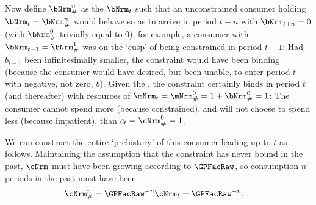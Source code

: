 \documentclass[\econtexRoot/BufferStockTheory]{subfiles}
\begin{document}
Now define $\bNrm_{\#}^{n}$ as the $\bNrm_{t}$ such that an unconstrained consumer holding $\bNrm_{t}=\bNrm_{\#}^{n}$ would behave so as to arrive in period $t+n$ with $\bNrm_{t+n}=0$ (with $\bNrm_{\#}^{0}$ trivially equal to 0); for example, a consumer with $\bNrm_{t-1}=\bNrm_{\#}^{1}$ was on the `cusp' of being constrained in period $t-1$: Had $b_{t-1}$ been infinitesimally smaller, the constraint would have been binding (because the consumer would have desired, but been unable, to enter period $t$ with negative, not zero, $b$).  Given
the \GICRaw, the constraint certainly binds in period $t$ (and thereafter) with resources of $\mNrm_{t}=\mNrm_{\#}^{0}=1+\bNrm_{\#}^{0}=1$: The consumer cannot spend more (because constrained), and will not choose to spend less (because impatient), than $c_{t}=\cNrm_{\#}^{0}=1$.

We can construct the entire `prehistory' of this consumer leading up to $t$ as follows.
Maintaining the assumption that the constraint has never bound in the past,
$\cNrm$ must have been growing according to $\GPFacRaw$, so consumption $n$ periods in the past must have been
\begin{equation}\begin{gathered}\begin{aligned}
  \cNrm_{\#}^{n}  & = \GPFacRaw^{-n} \cNrm_{t} = \GPFacRaw^{-n}. \label{eq:cPreHist}
\end{aligned}\end{gathered}\end{equation}
\end{document}

